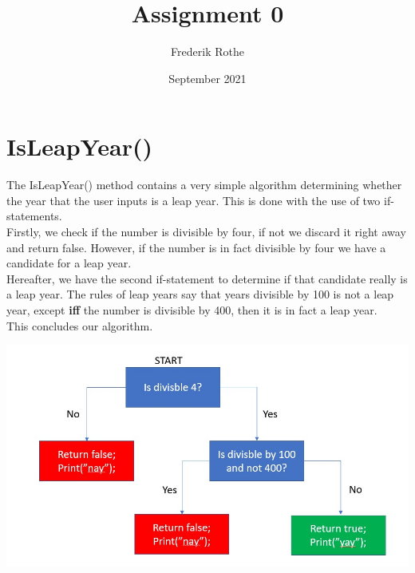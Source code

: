\documentclass{article}
\title{Assignment 0}
\author{Frederik Rothe}
\date{September 2021}
\begin{document}
\maketitle

\section{IsLeapYear()}

The IsLeapYear() method contains a very simple algorithm determining whether the year that the user inputs is a leap year. 
This is done with the use of two if-statements. \\
Firstly, we check if the number is divisible by four, if not we discard it right away and return false. However, if the number is in fact divisible by four we have a candidate for a leap year. \\
Hereafter, we have the second if-statement to determine if that candidate really is a leap year. The rules of leap years say that years divisible by 100 is not a leap year, except \textbf{iff} the number is divisible by 400, then it is in fact a leap year. \\
This concludes our algorithm.

\includegraphics[width=350p,height=200p]{IsLeapYearDiagram.jpg}
\end{document}
